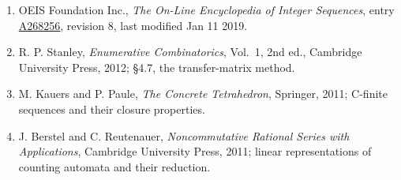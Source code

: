 \documentclass[11pt]{article}
\theoremstyle{definition}
\begin{document}
\begin{enumerate}

\item OEIS Foundation Inc., \emph{The On-Line Encyclopedia of Integer Sequences}, entry \href{https://oeis.org/A268256}{A268256}, revision 8, last modified Jan 11 2019.

\item R. P. Stanley, \emph{Enumerative Combinatorics}, Vol.~1, 2nd ed., Cambridge University Press, 2012; \S4.7, the transfer-matrix method.

\item M. Kauers and P. Paule, \emph{The Concrete Tetrahedron}, Springer, 2011; C-finite sequences and their closure properties.

\item J. Berstel and C. Reutenauer, \emph{Noncommutative Rational Series with Applications}, Cambridge University Press, 2011; linear representations of counting automata and their reduction.

\end{enumerate}
\end{document}
